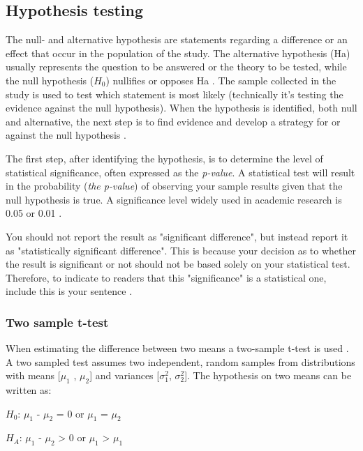 \subsection{Hypothesis testing}\label{sec:hypothesistesting}
The null- and alternative hypothesis are statements regarding a difference or an effect that occur in the population of the study. The alternative hypothesis (Ha) usually represents the question to be answered or the theory to be tested, while the null hypothesis ($H_{0}$) nullifies or opposes Ha \citep{Walpole2012}. The sample collected in the study is used to test which statement is most likely (technically it's testing the evidence against the null hypothesis).  When the hypothesis is identified, both null and alternative, the next step is to find evidence and develop a strategy for or against the null hypothesis \citep{LundResearchLtd2013}.

The first step, after identifying the hypothesis, is to determine the level of statistical significance, often expressed as the \textit{p-value}. A statistical test will result in the probability (\textit{the p-value}) of observing your sample results given that the null hypothesis is true. A significance level widely used in academic research is 0.05 or 0.01 \citep{Walpole2012}. 

You should not report the result as "significant difference", but instead report it as "statistically significant difference". This is because your decision as to whether the result is significant or not should not be based solely on your statistical test. Therefore, to indicate to readers that this "significance" is a statistical one, include this is your sentence \citep{LundResearchLtd2013a}. 


\subsubsection{Two sample t-test}\label{sec:t-test}
When estimating the difference between two means a two-sample t-test is used \citep{Walpole2012}. A two sampled test assumes two independent, random samples from distributions with means [$\mu_{1}$ , $\mu_{2}$] and variances [$\sigma_{1}^{2}$, $\sigma_{2}^{2}$]. %
The hypothesis on two means can be written as:\newline

\centerline{$H_{0}$: $\mu_{1}$ - $\mu_{2}$ = 0 or $\mu_{1}$ = $\mu_{2}$} 
\centerline{$H_{A}$: $\mu_{1}$ - $\mu_{2}$ > 0 or $\mu_{1}$ > $\mu_{1}$}
 
